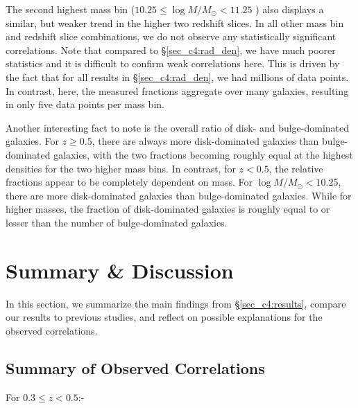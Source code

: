 The second highest mass bin ($10.25 \leq \log M/M_{\odot} < 11.25$ ) also displays a similar, but weaker trend in the higher two redshift slices.  In all other mass bin and redshift slice combinations, we do not observe any statistically significant correlations. Note that compared to \S \ref{sec_c4:rad_den}, we have much poorer statistics and it is difficult to confirm weak correlations here. This is driven by the fact that for all results in \S \ref{sec_c4:rad_den}, we had millions of data points. In contrast, here, the measured fractions aggregate over many galaxies, resulting in only five data points per mass bin. 

Another interesting fact to note is the overall ratio of disk- and bulge-dominated galaxies. For $z\geq0.5$, there are always more disk-dominated galaxies than bulge-dominated galaxies, with the two fractions becoming roughly equal at the highest densities for the two higher mass bins. In contrast, for $z < 0.5$, the relative fractions appear to be completely dependent on mass. For $\log M/M_\odot < 10.25$, there are more disk-dominated galaxies than bulge-dominated galaxies. While for higher masses, the fraction of disk-dominated galaxies is roughly equal to or lesser than the number of bulge-dominated galaxies.  


\section{Summary \& Discussion} \label{sec_c4:discussion}

In this section, we summarize the main findings from \S \ref{sec_c4:results}, compare our results to previous studies, and reflect on possible explanations for the observed correlations. 

\subsection{Summary of Observed Correlations} \label{sec_c4:summary}

For $0.3 \leq z < 0.5$:-

